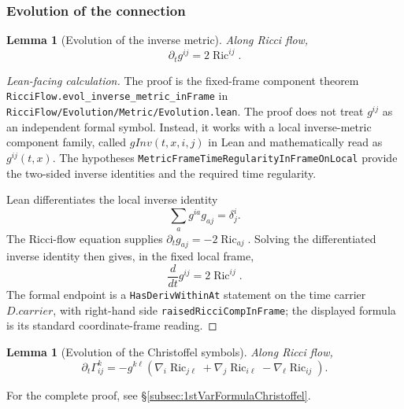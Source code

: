 \documentclass[11pt]{article}
\theoremstyle{plain}
\newtheorem{lemma}[theorem]{Lemma}
\theoremstyle{definition}
\theoremstyle{remark}
\newcommand{\Ric}{\operatorname{Ric}}
\newcommand{\leanref}[1]{\nolinkurl{#1}}
\newcommand{\leanfile}[1]{\nolinkurl{#1}}
\newcommand{\rffile}[1]{\leanfile{#1}}
\begin{document}
\subsubsection{Evolution of the connection}

\begin{lemma}[Evolution of the inverse metric]
\label{lem:evol-inverse-metric}
Along Ricci flow,
\[
\partial_tg^{ij}=2\Ric^{ij}.
\]
\end{lemma}

\begin{proof}[Lean-facing calculation]
The proof is the fixed-frame component theorem
\leanref{RicciFlow.evol_inverse_metric_inFrame} in
\rffile{RicciFlow/Evolution/Metric/Evolution.lean}.  The proof does not treat
\(g^{ij}\) as an independent formal symbol.  Instead, it works with a local
inverse-metric component family, called \(gInv(t,x,i,j)\) in Lean and
mathematically read as \(g^{ij}(t,x)\).  The hypotheses
\leanref{MetricFrameTimeRegularityInFrameOnLocal} provide the two-sided inverse
identities and the required time regularity.

Lean differentiates the local inverse identity
\[
  \sum_a g^{ia}g_{aj}=\delta^i_j .
\]
The Ricci-flow equation supplies
\(\partial_tg_{aj}=-2\Ric_{aj}\).  Solving the differentiated inverse identity
then gives, in the fixed local frame,
\[
  \frac d{dt}g^{ij}=2\Ric^{ij}.
\]
The formal endpoint is a \texttt{HasDerivWithinAt} statement on the time
carrier \(D.carrier\), with right-hand side
\leanref{raisedRicciCompInFrame}; the displayed formula is its standard
coordinate-frame reading.
\end{proof}

\begin{lemma}[Evolution of the Christoffel symbols]
\label{lem:evol-christoffel}
Along Ricci flow,
\[
\partial_t\Gamma^k_{ij}
=
-g^{k\ell}
\left(
\nabla_i\Ric_{j\ell}
+
\nabla_j\Ric_{i\ell}
-
\nabla_\ell\Ric_{ij}
\right).
\]
\end{lemma}

For the complete proof, see \S \ref{subsec:1stVarFormulaChristoffel}.
\end{document}
